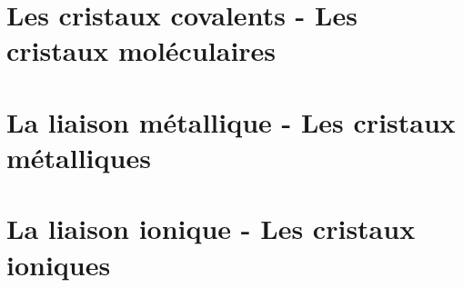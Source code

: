 \documentclass[13pt, twoside, a4paper, french, tikz]{report}
\begin{document}
\chapter{Les cristaux covalents - Les cristaux moléculaires}\label{ch:les-cristaux-covalents---les-cristaux-moleculaires}


\chapter{La liaison métallique - Les cristaux métalliques}\label{ch:la-liaison-metallique---les-cristaux-metalliques}


\chapter{La liaison ionique - Les cristaux ioniques}\label{ch:la-liaison-ionique---les-cristaux-ioniques}
\end{document}

